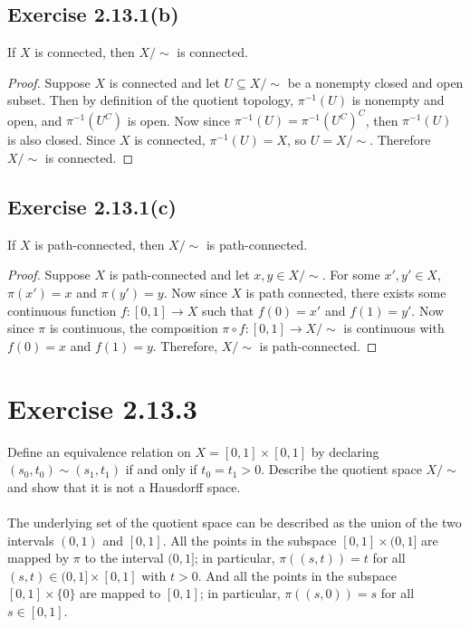 \documentclass[12pt]{article}
\newenvironment{problem}
    {\begin{lrbox}{\mybox}\begin{minipage}{\textwidth-10pt}}
    {\end{minipage}\end{lrbox}\framebox[6.5in]{\usebox{\mybox}}}
\newenvironment{response}{\paragraph{}}{}
\begin{document}
\subsection*{Exercise 2.13.1(b)}
\begin{problem}
    If $X$ is connected, then $X/\sim$ is connected.
\end{problem}

\begin{proof}
     Suppose $X$ is connected and let $U\subseteq X/\sim$ be a nonempty closed and open subset. Then by definition of the quotient topology, $\pi^{-1}(U)$ is nonempty and open, and $\pi^{-1}(U^C)$ is open. Now since $\pi^{-1}(U) = \pi^{-1}(U^C)^C$, then $\pi^{-1}(U)$ is also closed. Since $X$ is connected, $\pi^{-1}(U)= X$, so $U=X/\sim$. Therefore $X/\sim$ is connected. 
    
\end{proof}

\subsection*{Exercise 2.13.1(c)}
\begin{problem}
    If $X$ is path-connected, then $X/\sim$ is path-connected.
\end{problem}

\begin{proof}
     Suppose $X$ is path-connected and let $x,y\in X/\sim$. For some $x',y'\in X$, $\pi(x')=x$ and $\pi(y')=y$. Now since $X$ is path connected, there exists some continuous function $f:[0,1]\to X$ such that $f(0)=x'$ and $f(1)=y'$. Now since $\pi$ is continuous, the composition $\pi\circ f: [0,1] \to X/\sim$ is continuous with $f(0)=x$ and $f(1)=y$. Therefore, $X/\sim$ is path-connected.
    
\end{proof}

\section*{Exercise 2.13.3}
\begin{problem}
    Define an equivalence relation on $X=[0,1]\times[0,1]$ by declaring $(s_0,t_0)\sim (s_1,t_1)$ if and only if $t_0=t_1>0$. Describe the quotient space $X/\sim$ and show that it is not a Hausdorff space.
\end{problem}

\begin{response}
    The underlying set of the quotient space can be described as the union of the two intervals $(0,1)$ and $[0,1]$. All the points in the subspace $[0,1]\times(0,1]$ are mapped by $\pi$ to the interval $(0,1]$; in particular, $\pi((s,t))=t$ for all $(s,t)\in(0,1]\times[0,1]$ with $t>0$. And all the points in the subspace $[0,1]\times\{0\}$ are mapped to $[0,1]$; in particular, $\pi((s,0))=s$ for all $s\in[0,1]$.
    
\end{response}
\end{document}
